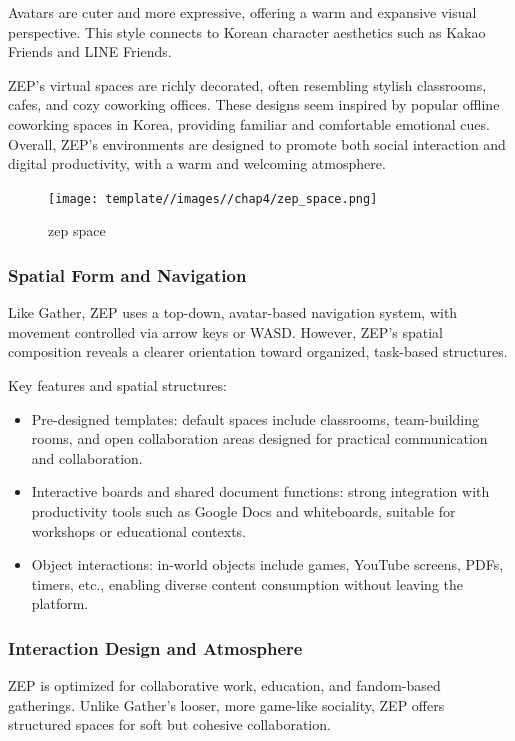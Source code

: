 Avatars are cuter and more expressive, offering a warm and expansive visual perspective. This style connects to Korean character aesthetics such as Kakao Friends and LINE Friends.  

ZEP’s virtual spaces are richly decorated, often resembling stylish classrooms, cafes, and cozy coworking offices. These designs seem inspired by popular offline coworking spaces in Korea, providing familiar and comfortable emotional cues. Overall, ZEP’s environments are designed to promote both social interaction and digital productivity, with a warm and welcoming atmosphere.  

\begin{figure}
    \centering
    \texttt{[image: template//images//chap4/zep\_space.png]}
    \caption{zep space}
    \label{fig:placeholder}
\end{figure}

\subsubsection{Spatial Form and Navigation}
Like Gather, ZEP uses a top-down, avatar-based navigation system, with movement controlled via arrow keys or WASD. However, ZEP’s spatial composition reveals a clearer orientation toward organized, task-based structures.  

Key features and spatial structures:
\begin{itemize}
    \item Pre-designed templates: default spaces include classrooms, team-building rooms, and open collaboration areas designed for practical communication and collaboration.  
    \item Interactive boards and shared document functions: strong integration with productivity tools such as Google Docs and whiteboards, suitable for workshops or educational contexts.  
    \item Object interactions: in-world objects include games, YouTube screens, PDFs, timers, etc., enabling diverse content consumption without leaving the platform.  
\end{itemize}

\subsubsection{Interaction Design and Atmosphere}
ZEP is optimized for collaborative work, education, and fandom-based gatherings. Unlike Gather’s looser, more game-like sociality, ZEP offers structured spaces for soft but cohesive collaboration.  

